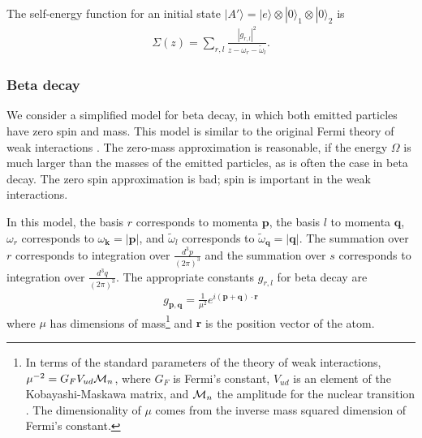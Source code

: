 \documentclass[12pt]{article}
\numberwithin{equation}{section}
\begin{document}
The self-energy function  for an initial state $|A'\rangle = |e\rangle \otimes |0\rangle_1 \otimes |0\rangle_2$ is
\begin{eqnarray}
\Sigma(z) = \sum_{r, l} \frac{|g_{r,l}|^2}{z - \omega_r - \tilde{\omega}_l}. \label{sig2f}
\end{eqnarray}

\subsubsection{Beta decay}
We consider a simplified model for beta decay, in which both emitted particles have zero spin and mass. This model is similar to the original Fermi theory of weak interactions \cite{Fermi, Wilson}.
 The zero-mass approximation is reasonable, if the energy $\Omega$ is much larger than the masses of the emitted particles, as is often the case in beta decay. The zero spin approximation is bad; spin is important in the weak interactions.



In this model, the basis $r$ corresponds to momenta ${\pmb p}$, the basis $l$ to momenta ${\pmb q}$, $\omega_r$
  corresponds to $\omega_{\pmb k } = |{\pmb p}|$, and $\tilde{\omega}_l$
  corresponds to $\tilde{\omega}_{\pmb q } = |{\pmb q}|$. The summation over $r$ corresponds to integration over  $\frac{d^3p}{(2\pi)^3}$ and the summation over $s$ corresponds to integration over  $\frac{d^3q}{(2\pi)^3}$. The appropriate constants $g_{r,l}$ for beta decay are
 \begin{eqnarray}
  g_{{\pmb p}, {\pmb q}} = \frac{1}{\mu^2}e^{i({\pmb p}+{\pmb q})\cdot{\pmb r}}
  \end{eqnarray}
   where $\mu$ has dimensions of mass\footnote{In terms of the standard parameters of the theory of weak interactions, $\mu^{-2} = G_F V_{ud} {\cal M}_n$, where $G_F$ is Fermi's constant, $V_{ud}$ is an element of the Kobayashi-Maskawa matrix, and ${\cal M}_n$ the amplitude for the nuclear transition \cite{nuclear}. The dimensionality of $\mu$ comes from the inverse mass squared dimension of Fermi's constant.   } and   ${\pmb r}$ is the position vector of the atom.
\end{document}
